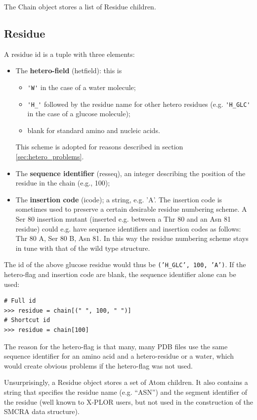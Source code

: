 The Chain object stores a list of Residue children.

\subsection{Residue}

A residue id is a tuple with three elements:

\begin{itemize}
\item The \textbf{hetero-field} (hetfield): this is
    \begin{itemize}
    \item \verb+'W'+ in the case of a water molecule;
    \item \verb+'H_'+ followed by the residue name for other hetero residues (e.g. \verb+'H_GLC'+ in the case of a glucose molecule);
    \item blank for standard amino and nucleic acids.
    \end{itemize}
This scheme is adopted for reasons described in section \ref{sec:hetero_problems}.
\item The \textbf{sequence identifier} (resseq), an integer describing the position of the residue in the chain (e.g., 100);
\item The \textbf{insertion code} (icode); a string, e.g. 'A'. The insertion code is sometimes used to preserve a certain desirable residue numbering scheme. A Ser 80 insertion mutant (inserted e.g. between a Thr 80 and an Asn 81
residue) could e.g. have sequence identifiers and insertion codes
as follows: Thr 80 A, Ser 80 B, Asn 81. In this way the residue numbering
scheme stays in tune with that of the wild type structure.
\end{itemize}
The id of the above glucose residue would thus be \texttt{('H\_GLC',
100, 'A')}. If the hetero-flag and insertion code are blank, the sequence
identifier alone can be used:

\begin{verbatim}
# Full id
>>> residue = chain[(" ", 100, " ")]
# Shortcut id
>>> residue = chain[100]
\end{verbatim}
The reason for the hetero-flag is that many, many PDB files use the
same sequence identifier for an amino acid and a hetero-residue or
a water, which would create obvious problems if the hetero-flag was
not used.

Unsurprisingly, a Residue object stores a set of Atom children. It also contains a string that specifies the residue name (e.g. ``ASN'')
and the segment identifier of the residue (well known to X-PLOR users, but not
used in the construction of the SMCRA data structure).

